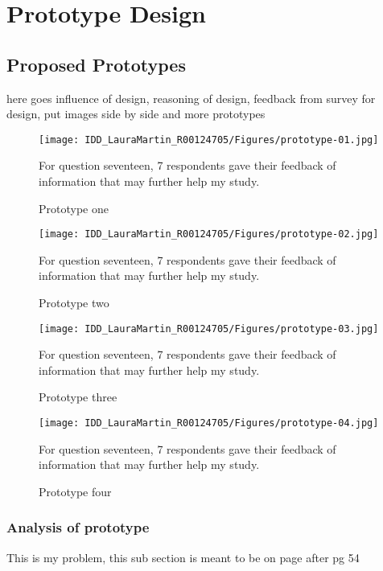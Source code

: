 \chapter{Prototype Design}
\label{chap:Prototype Design}

\section{Proposed Prototypes}

here goes influence of design, reasoning of design, feedback from survey for design,
put images side by side and more prototypes


\begin{figure}[h]
\centering
\texttt{[image: IDD\_LauraMartin\_R00124705/Figures/prototype-01.jpg]}
\caption{Prototype one}
{For question seventeen, 7 respondents gave their feedback of information that may further help my study.}
\end{figure}

\begin{figure}[h]
\centering
\texttt{[image: IDD\_LauraMartin\_R00124705/Figures/prototype-02.jpg]}
\caption{Prototype two}
{For question seventeen, 7 respondents gave their feedback of information that may further help my study.}
\end{figure}

\begin{figure}[h]
\centering
\texttt{[image: IDD\_LauraMartin\_R00124705/Figures/prototype-03.jpg]}
\caption{Prototype three}
{For question seventeen, 7 respondents gave their feedback of information that may further help my study.}
\end{figure}

\begin{figure}[h]
\centering
\texttt{[image: IDD\_LauraMartin\_R00124705/Figures/prototype-04.jpg]}
\caption{Prototype four}
{For question seventeen, 7 respondents gave their feedback of information that may further help my study.}
\end{figure}

\subsection{Analysis of prototype}
This is my problem, this sub section is meant to be on page after pg 54




%
%